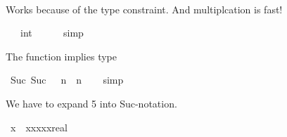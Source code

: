 \begin{isabellebody}
\ \ %
\endisadelimproof
%
\isatagproof
{}\isamarkupfalse%
%
\endisatagproof
{\isafoldproof}%
%
\isadelimproof
%
\endisadelimproof
%
\begin{isamarkuptext}%
Works because of the type constraint. And multiplcation is fast!%
\end{isamarkuptext}\isamarkuptrue%
\isamarkupfalse%
\ {\isachardoublequoteopen}{}{}{}{}{}{}{}{}{}\ {\isacharasterisk}{\kern0pt}\ {\isacharparenleft}{\kern0pt}{}{}{}{}{}{}{}{}{}{\isacharcolon}{\kern0pt}{\isacharcolon}{\kern0pt}int{\isacharparenright}{\kern0pt}\ {\isacharequal}{\kern0pt}\ {}{}{}{}{}{}{}{}{}{}{}{}{}{}{}{}{}{}{\isachardoublequoteclose}\isanewline
%
\isadelimproof
\ \ %
\endisadelimproof
%
\isatagproof
{}\isamarkupfalse%
\ simp%
\endisatagproof
{\isafoldproof}%
%
\isadelimproof
%
\endisadelimproof
%
\begin{isamarkuptext}%
The function  implies type %
\end{isamarkuptext}\isamarkuptrue%
\isamarkupfalse%
\ {\isachardoublequoteopen}Suc\ {\isacharparenleft}{\kern0pt}Suc\ {}{\isacharparenright}{\kern0pt}\ {\isacharasterisk}{\kern0pt}\ n\ {\isacharequal}{\kern0pt}\ n{\isacharasterisk}{\kern0pt}{}{\isachardoublequoteclose}\isanewline
%
\isadelimproof
\ \ %
\endisadelimproof
%
\isatagproof
{}\isamarkupfalse%
\ simp%
\endisatagproof
{\isafoldproof}%
%
\isadelimproof
%
\endisadelimproof
%
\begin{isamarkuptext}%
We have to expand 5 into Suc-notation.%
\end{isamarkuptext}\isamarkuptrue%
\isamarkupfalse%
\ {\isachardoublequoteopen}x{\isacharcircum}{\kern0pt}{}\ {\isacharequal}{\kern0pt}\ x{\isacharasterisk}{\kern0pt}x{\isacharasterisk}{\kern0pt}x{\isacharasterisk}{\kern0pt}x{\isacharasterisk}{\kern0pt}{\isacharparenleft}{\kern0pt}x{\isacharcolon}{\kern0pt}{\isacharcolon}{\kern0pt}real{\isacharparenright}{\kern0pt}{\isachardoublequoteclose}\isanewline
%
\isadelimproof
\ \ %
\endisadelimproof
%
\isatagproof

\end{isabellebody}
